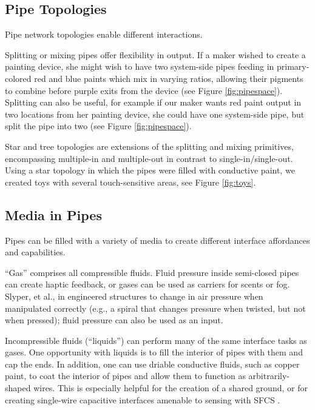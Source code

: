 \subsection{Pipe Topologies}

Pipe network topologies enable different interactions.

Splitting or mixing pipes offer flexibility in output.  If a maker wished to create a painting device, she might wish to have two system-side pipes feeding in primary-colored red and blue paints which mix in varying ratios, allowing their pigments to combine before purple exits from the device (see Figure \ref{fig:pipespace}).  Splitting can also be useful, for example if our maker wants red paint output in two locations from her painting device, she could have one system-side pipe, but split the pipe into two (see Figure \ref{fig:pipespace}).  

Star and tree topologies are extensions of the splitting and mixing primitives, encompassing multiple-in and multiple-out in contrast to single-in/single-out.  Using a star topology in which the pipes were filled with conductive paint, we created toys with several touch-sensitive areas, see Figure \ref{fig:toys}. 

\subsection{Media in Pipes}

Pipes can be filled with a variety of media to create different interface affordances and capabilities.

``Gas'' comprises all compressible fluids.  Fluid pressure inside semi-closed pipes can create haptic feedback, or gases can be used as carriers for scents or fog.  Slyper, et al.,  in \cite{Slyper-pressure} engineered structures to change in air pressure when manipulated correctly (e.g., a spiral that changes pressure when twisted, but not when pressed); fluid pressure can also be used as an input.

Incompressible fluids (``liquids'') can perform many of the same interface tasks as gases.  One opportunity with liquids is to fill the interior of pipes with them and cap the ends.  In addition, one can use driable conductive fluids, such as copper paint, to coat the interior of pipes and allow them to function as arbitrarily-shaped wires.  This is especially helpful for the creation of a shared ground, or for creating single-wire capacitive interfaces amenable to sensing with SFCS \cite{Sato-touche}.

